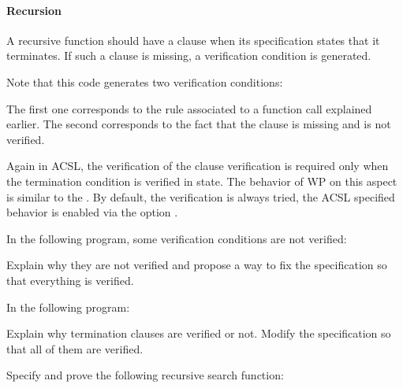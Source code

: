 \paragraph{Recursion}


A recursive function should have a  clause when its
specification states that it terminates. If such a clause is missing, a
verification condition  is generated.




Note that this code generates two verification conditions:




The first one corresponds to the rule associated to a function call explained
earlier. The second corresponds to the fact that the 
clause is missing and is not verified.


Again in ACSL, the verification of the  clause
verification is required only when the termination condition is verified in
 state. The behavior of WP on this aspect is similar to the
. By default, the verification is always tried, the
ACSL specified behavior is enabled via the option
.








In the following program, some verification conditions are not verified:




Explain why they are not verified and propose a way to fix the specification so
that everything is verified.




In the following program:




Explain why termination clauses are verified or not. Modify the specification so
that all of them are verified.




Specify and prove the following recursive search function:




